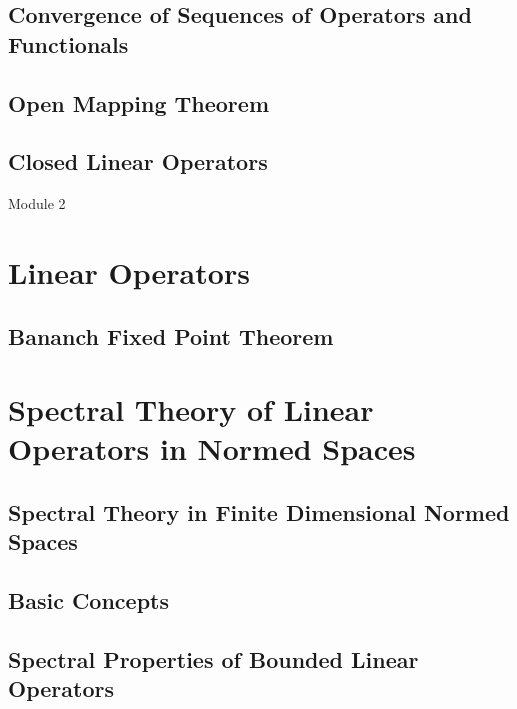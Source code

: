 \subsection{Convergence of Sequences of Operators and Functionals}
\setcounter{subsection}{11}
\subsection{Open Mapping Theorem}
\subsection{Closed Linear Operators}
\pagebreak

{\Large Module 2}
\section{Linear Operators}
\subsection{Bananch Fixed Point Theorem}
\setcounter{section}{6}
\section{Spectral Theory of Linear Operators in Normed Spaces}
\subsection{Spectral Theory in Finite Dimensional Normed Spaces}
\subsection{Basic Concepts}
\subsection{Spectral Properties of Bounded Linear Operators}
